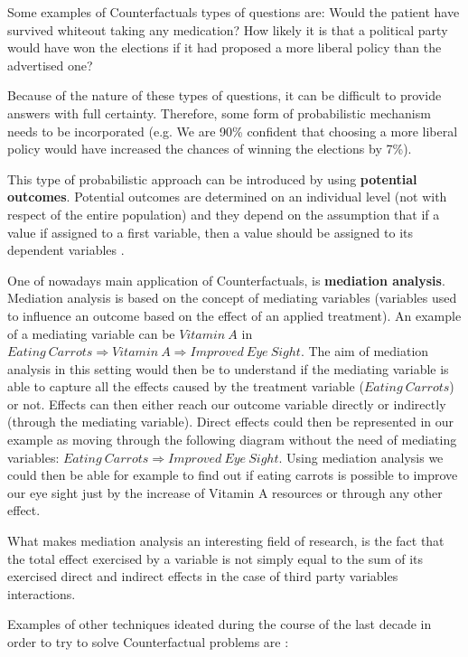 Some examples of Counterfactuals types of questions are: Would the patient have survived whiteout taking any medication? How likely it is that a political party would have won the elections if it had proposed a more liberal policy than the advertised one? 

Because of the nature of these types of questions, it can be difficult to provide answers with full certainty. Therefore, some form of probabilistic mechanism needs to be incorporated (e.g. We are 90\% confident that choosing a more liberal policy would have increased the chances of winning the elections by 7\%).

This type of probabilistic approach can be introduced by using \textbf{potential outcomes}. Potential outcomes are determined on an individual level (not with respect of the entire population) and they depend on the assumption that if a value if assigned to a first variable, then a value should be assigned to its dependent variables \cite{why}.

One of nowadays main application of Counterfactuals, is \textbf{mediation analysis}. Mediation analysis is based on the concept of mediating variables (variables used to influence an outcome based on the effect of an applied treatment). An example of a mediating variable can be $Vitamin\:A$ in $Eating\:Carrots \Rightarrow Vitamin\:A \Rightarrow Improved\:Eye\:Sight$. The aim of mediation analysis in this setting would then be to understand if the mediating variable is able to capture all the effects caused by the treatment variable ($Eating\:Carrots$) or not. Effects can then either reach our outcome variable directly or indirectly (through the mediating variable). Direct effects could then be represented in our example as moving through the following diagram without the need of mediating variables: $Eating\:Carrots \Rightarrow Improved\:Eye\:Sight$. Using mediation analysis we could then be able for example to find out if eating carrots is possible to improve our eye sight just by the increase of Vitamin A resources or through any other effect.

What makes mediation analysis an interesting field of research, is the fact that the total effect exercised by a variable is not simply equal to the sum of its exercised direct and indirect effects in the case of third party variables interactions.

Examples of other techniques ideated during the course of the last decade in order to try to solve Counterfactual problems are \cite{eva}:

